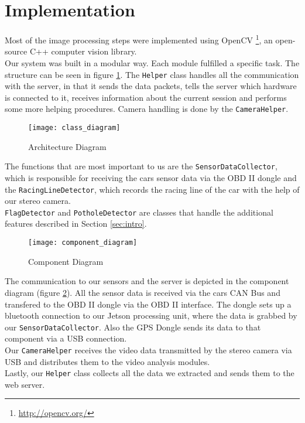 \section{Implementation}
\label{sec:implementation}

Most of the image processing steps were implemented using OpenCV \footnote{\url{http://opencv.org/}}, an open-source C++ computer vision library.\\
Our system was built in a modular way. Each module fulfilled a specific task. The structure can be seen in figure \ref{fig:class_diagram}. The \texttt{Helper} class handles all the communication with the server, in that it sends the data packets, tells the server which hardware is connected to it, receives information about the current session and performs some more helping procedures. Camera handling is done by the \texttt{CameraHelper}.

\begin{figure}[!ht]
\centering
\texttt{[image: class\_diagram]}
\caption{Architecture Diagram}
\label{fig:class_diagram}
\end{figure}

\clearpage

The functions that are most important to us are the \texttt{SensorDataCollector}, which is responsible for receiving the cars sensor data via the OBD II dongle and the \texttt{RacingLineDetector}, which records the racing line of the car with the help of our stereo camera.\\
\texttt{FlagDetector} and \texttt{PotholeDetector} are classes that handle the additional features described in Section \ref{sec:intro}.

\begin{figure}[!ht]
	\texttt{[image: component\_diagram]}
	\caption{Component Diagram}
	\label{fig:component_diagram}
\end{figure}

The communication to our sensors and the server is depicted in the component diagram (figure \ref{fig:component_diagram}). All the sensor data is received via the cars CAN Bus and transfered to the OBD II dongle via the OBD II interface. The dongle sets up a bluetooth connection to our Jetson processing unit, where the data is grabbed by our \texttt{SensorDataCollector}. Also the GPS Dongle sends its data to that component via a USB connection.\\
Our \texttt{CameraHelper} receives the video data transmitted by the stereo camera via USB and distributes them to the video analysis modules.\\
Lastly, our \texttt{Helper} class collects all the data we extracted and sends them to the web server.

